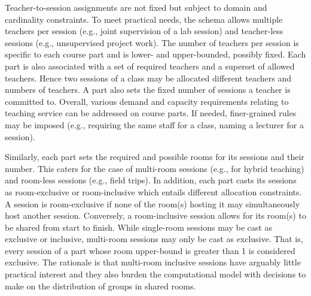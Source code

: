 Teacher-to-session assignments are not fixed
but subject to domain and cardinality constraints.
To meet practical needs, 
the schema allows multiple teachers per session
(e.g., joint supervision of a lab session) %
and %
teacher-less sessions 
(e.g., unsupervised project work).
The number of teachers per session is specific to each course part
and is lower- and upper-bounded, possibly fixed.
Each part is also associated with 
a set of required teachers
and a superset of allowed teachers.
Hence two sessions of a class may be allocated different teachers and numbers of teachers.
A part also sets the fixed number of sessions a teacher is committed to.
Overall, various demand and capacity requirements relating to teaching service 
can be addressed on course parts.
If needed, finer-grained rules may be imposed
(e.g., requiring the same staff for a class, naming a lecturer for a session).

Similarly, each part sets the required and possible rooms for its sessions and their number.
This caters for the case of multi-room sessions (e.g., for hybrid teaching)
and room-less sessions (e.g., field trips). %
In addition, each part casts its sessions as room-exclusive or room-inclusive
which entails different allocation constraints.
A session is room-exclusive if none of the room(s) hosting it may simultaneously host another session.
Conversely, a room-inclusive session allows for its room(s) to be shared from start to finish.
While single-room sessions may be cast as exclusive or inclusive,
multi-room sessions may only be cast as exclusive.
That is, every session of a part whose room upper-bound is greater than 1 is considered exclusive. 
The rationale is that multi-room inclusive sessions have arguably little practical interest %
and they also burden the computational model with decisions to make on the distribution of groups in shared rooms. 

